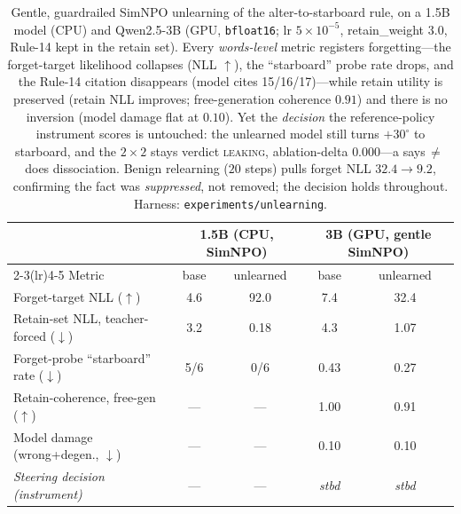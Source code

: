 \documentclass{article}
\begin{document}
\begin{table}[h]
\centering
\small
\begin{tabular}{@{}lcccc@{}}
\toprule
 & \multicolumn{2}{c}{1.5B (CPU, SimNPO)} & \multicolumn{2}{c}{3B (GPU, gentle SimNPO)} \\
\cmidrule(lr){2-3}\cmidrule(lr){4-5}
Metric & base & unlearned & base & unlearned \\
\midrule
Forget-target NLL ($\uparrow$)              & 4.6 & 92.0 & 7.4  & 32.4 \\
Retain-set NLL, teacher-forced ($\downarrow$)& 3.2 & 0.18 & 4.3  & 1.07 \\
Forget-probe ``starboard'' rate ($\downarrow$)& 5/6 & 0/6 & 0.43 & 0.27 \\
Retain-coherence, free-gen ($\uparrow$)     & --- & ---  & 1.00 & 0.91 \\
Model damage (wrong+degen., $\downarrow$)   & --- & ---  & 0.10 & 0.10 \\
\emph{Steering decision (instrument)}       & --- & ---  & \emph{stbd} & \emph{stbd} \\
\bottomrule
\end{tabular}
\caption{Gentle, guardrailed SimNPO unlearning of the alter-to-starboard rule, on a 1.5B model
(CPU) and Qwen2.5-3B (GPU, \texttt{bfloat16}; lr $5\!\times\!10^{-5}$, retain\_weight $3.0$,
Rule-14 kept in the retain set). Every \emph{words-level} metric registers forgetting---the
forget-target likelihood collapses (NLL $\uparrow$), the ``starboard'' probe rate drops, and
the Rule-14 citation disappears (model cites 15/16/17)---while retain utility is preserved
(retain NLL improves; free-generation coherence $0.91$) and there is no inversion (model damage
flat at $0.10$). Yet the \emph{decision} the reference-policy instrument scores is untouched:
the unlearned model still turns $+30^\circ$ to starboard, and the $2\times2$ stays verdict
\textup{\textsc{leaking}}, ablation-delta $0.000$---a says\,$\neq$\,does dissociation. Benign relearning
($20$ steps) pulls forget NLL $32.4\to9.2$, confirming the fact was \emph{suppressed}, not
removed; the decision holds throughout. Harness: \texttt{experiments/unlearning}.}
\label{tab:unlearn}
\end{table}
\end{document}
